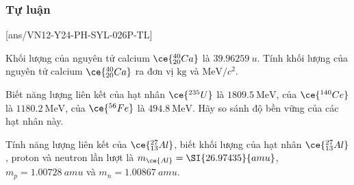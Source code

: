 \subsubsection{Tự luận}
\setcounter{ex}{0}
[ans/VN12-Y24-PH-SYL-026P-TL]
\begin{ex}
	Khối lượng của nguyên tử calcium $\ce{_{20}^{40}Ca}$ là $\SI{39.96259 }{u}$. Tính khối lượng của nguyên tử calcium $\ce{_{20}^{40}Ca}$ ra đơn vị $\si{\kilo\gram}$ và $\si{\mega\electronvolt/c^2}$.
\end{ex}
\begin{ex}
	Biết năng lượng liên kết của hạt nhân $\ce{^{235}U}$ là $\SI{1809.5}{\mega\electronvolt}$, của $\ce{^{140}Ce}$ là $\SI{1180.2}{\mega\electronvolt}$, của $\ce{^{56}Fe}$ là $\SI{494.8}{\mega\electronvolt}$. Hãy so sánh độ bền vững của các hạt nhân này.	
\end{ex}
\begin{ex}
	Tính năng lượng liên kết của $\ce{_{13}^{27}Al}$, biết khối lượng của hạt nhân $\ce{_{13}^{27}Al}$, proton và neutron lần lượt là $m_{\ce{Al}}=\SI{26.97435}{amu}$, $m_{p}=\SI{1.00728}{amu}$ và $m_{n}=\SI{1.00867}{amu}$.
\end{ex}
